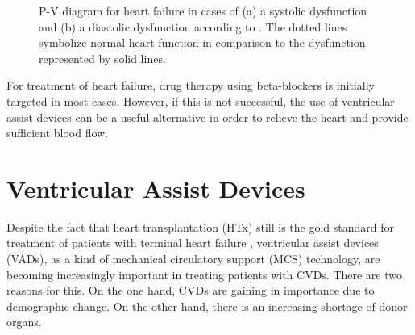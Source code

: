 \begin{figure}[ht]
  \centering
  \caption[P-V diagram for heart failure]{P-V diagram for heart failure in cases of (a) a systolic dysfunction and (b) a diastolic dysfunction according to \cite{HKS_pv}. The dotted lines symbolize normal heart function in comparison to the dysfunction represented by solid lines.}
  \label{fig:hf_dys}
\end{figure}

For treatment of heart failure, drug therapy using beta-blockers is initially targeted in most cases. However, if this is not successful, the use of ventricular assist devices can be a useful alternative in order to relieve the heart and provide sufficient blood flow. \cite{HKS4}

\section{Ventricular Assist Devices}
Despite the fact that heart transplantation (HTx) still is the gold standard for treatment of patients with terminal heart failure \cite{VAD2}, ventricular assist devices (VADs), as a kind of mechanical circulatory support (MCS) technology, are becoming increasingly important in treating patients with CVDs. There are two reasons for this. On the one hand, CVDs are gaining in importance due to demographic change. On the other hand, there is an increasing shortage of donor organs. \cite{VAD7}

